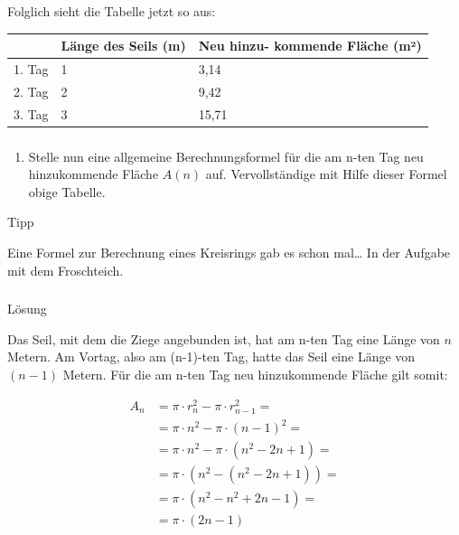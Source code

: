 \documentclass[
  ngerman,
]{book}
\providecommand{\tightlist}{%
  \setlength{\itemsep}{0pt}\setlength{\parskip}{0pt}}
\begin{document}
Folglich sieht die Tabelle jetzt so aus:

\begin{longtable}[]{@{}lll@{}}
\toprule
& Länge des Seils (m) & Neu hinzu- kommende Fläche (m²)\tabularnewline
\midrule
\endhead
1. Tag & 1 & 3,14\tabularnewline
2. Tag & 2 & 9,42\tabularnewline
3. Tag & 3 & 15,71\tabularnewline
\bottomrule
\end{longtable}

\hypertarget{section-52}{%
\subsubsection*{}\label{section-52}}

\begin{enumerate}
\def\labelenumi{\alph{enumi})}
\setcounter{enumi}{1}
\tightlist
\item
  Stelle nun eine allgemeine Berechnungsformel für die am n-ten Tag neu hinzukommende Fläche \(A(n)\) auf. Vervollständige mit Hilfe dieser Formel obige Tabelle.
\end{enumerate}

Tipp

Eine Formel zur Berechnung eines Kreisrings gab es schon mal\ldots{} In der Aufgabe mit dem Froschteich.

\hypertarget{section-53}{%
\subsubsection*{}\label{section-53}}

Lösung

Das Seil, mit dem die Ziege angebunden ist, hat am n-ten Tag eine Länge von \(n\) Metern. Am Vortag, also am (n-1)-ten Tag, hatte das Seil eine Länge von \((n-1)\) Metern. Für die am n-ten Tag neu hinzukommende Fläche gilt somit:

\[\begin{align} A_n &= \pi \cdot r^2_n - \pi \cdot r^2_{n-1}=\\
                    &=\pi \cdot n^2 - \pi \cdot (n-1)^2=\\
                    &= \pi \cdot n^2 - \pi \cdot (n^2 - 2n + 1)= \\
                    &=\pi \cdot (n^2 - (n^2- 2n + 1))=\\
                    &=\pi \cdot (n^2- n^2+2n-1)=\\
                    &=\pi \cdot(2n-1)
\end{align}\]
\end{document}
